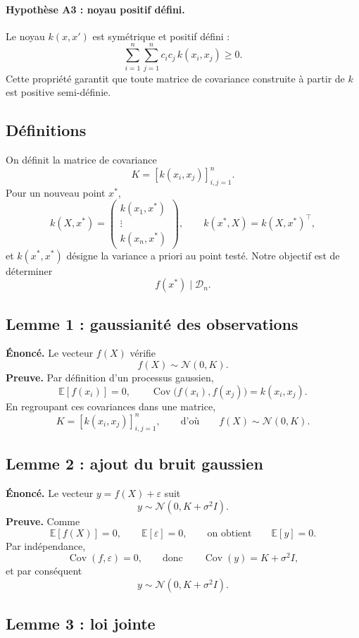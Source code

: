\documentclass[12pt]{article}
\newcommand{\E}{\mathbb{E}}
\newcommand{\N}{\mathcal{N}}
\newcommand{\D}{\mathcal{D}}
\newcommand{\K}{K}
\newcommand{\xs}{x^{*}}
\DeclareMathOperator{\Cov}{Cov}
\begin{document}
\paragraph{Hypothèse A3 : noyau positif défini.}
Le noyau $k(x,x')$ est symétrique et positif défini :
\[
\sum_{i=1}^n \sum_{j=1}^n c_i c_j\, k(x_i,x_j) \ge 0.
\]
Cette propriété garantit que toute matrice de covariance construite à partir de
$k$ est positive semi-définie.

\subsection*{Définitions}

On définit la matrice de covariance
\[
\K = [k(x_i,x_j)]_{i,j=1}^n.
\]
Pour un nouveau point $\xs$,
\[
k(X,\xs) =
\begin{pmatrix} k(x_1,\xs) \\ \vdots \\ k(x_n,\xs) \end{pmatrix},
\qquad
k(\xs,X) = k(X,\xs)^\top,
\]
et $k(\xs,\xs)$ désigne la variance a priori au point testé. Notre objectif est de
déterminer
\[
f(\xs) \mid \D_n.
\]

\subsection*{Lemme 1 : gaussianité des observations}

\textbf{Énoncé.} Le vecteur $f(X)$ vérifie
\[
\boxed{\,f(X) \sim \N(0,\K).\,}
\]
\textbf{Preuve.} Par définition d'un processus gaussien,
\[
\E[f(x_i)] = 0,
\qquad
\Cov\bigl(f(x_i),f(x_j)\bigr) = k(x_i,x_j).
\]
En regroupant ces covariances dans une matrice,
\[
\K = [k(x_i,x_j)]_{i,j=1}^n,
\qquad\text{d'où}\qquad
f(X) \sim \N(0,\K).
\]

\subsection*{Lemme 2 : ajout du bruit gaussien}

\textbf{Énoncé.} Le vecteur $y = f(X) + \varepsilon$ suit
\[
\boxed{\,y \sim \N(0, \K + \sigma^2 I).\,}
\]
\textbf{Preuve.} Comme
\[
\E[f(X)] = 0, \qquad \E[\varepsilon] = 0,
\qquad\text{on obtient}\qquad
\E[y] = 0.
\]
Par indépendance,
\[
\Cov(f,\varepsilon) = 0,
\qquad\text{donc}\qquad
\Cov(y) = \K + \sigma^2 I,
\]
et par conséquent
\[
y \sim \N(0, \K + \sigma^2 I).
\]

\subsection*{Lemme 3 : loi jointe}
\end{document}
